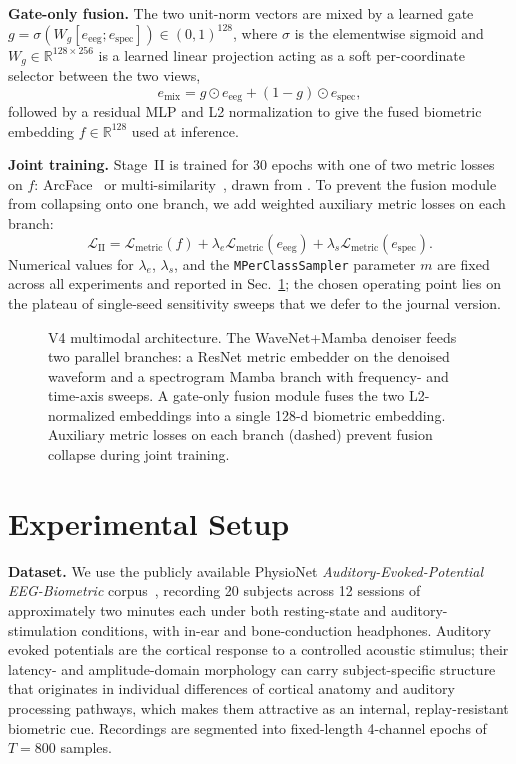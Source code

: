 \documentclass[conference,a4paper]{APSIPA2026}
\begin{document}
\textbf{Gate-only fusion.} The two unit-norm vectors are mixed by a
learned gate
$g=\sigma(W_g[e_{\mathrm{eeg}};e_{\mathrm{spec}}])\in(0,1)^{128}$,
where $\sigma$ is the elementwise sigmoid and
$W_g\in\mathbb{R}^{128\times 256}$ is a learned linear projection
acting as a soft per-coordinate selector between the two views,
\begin{equation}
e_{\mathrm{mix}}=g\odot e_{\mathrm{eeg}}
+(1-g)\odot e_{\mathrm{spec}},
\end{equation}
followed by a residual MLP and L2 normalization to give the fused
biometric embedding $f\in\mathbb{R}^{128}$ used at inference.

\textbf{Joint training.} Stage~II is trained for 30 epochs with one of
two metric losses on $f$: ArcFace~\cite{deng2019arcface} or
multi-similarity~\cite{wang2019multisim}, drawn from
\cite{musgrave2020pml}. To prevent the fusion module from collapsing onto
one branch, we add weighted auxiliary metric losses on each branch:
\begin{equation}
\mathcal{L}_{\mathrm{II}}=\mathcal{L}_{\mathrm{metric}}(f)
+\lambda_{e}\mathcal{L}_{\mathrm{metric}}(e_{\mathrm{eeg}})
+\lambda_{s}\mathcal{L}_{\mathrm{metric}}(e_{\mathrm{spec}}).
\end{equation}
Numerical values for $\lambda_{e}$, $\lambda_{s}$, and the
\texttt{MPerClassSampler} parameter $m$ are fixed across all
experiments and reported in Sec.~\ref{sec:setup}; the chosen
operating point lies on the plateau of single-seed sensitivity
sweeps that we defer to the journal version.

\begin{figure}[t]
\centering
\resizebox{\textwidth}{!}{}
\caption{V4 multimodal architecture. The WaveNet+Mamba denoiser feeds two
parallel branches: a ResNet metric embedder on the denoised waveform and
a spectrogram Mamba branch with frequency- and time-axis sweeps. A
gate-only fusion module fuses the two L2-normalized
embeddings into a single 128-d biometric embedding. Auxiliary metric losses
on each branch (dashed) prevent fusion collapse during joint training.}
\label{fig:v4-arch}
\end{figure}

\section{Experimental Setup}
\label{sec:setup}
\textbf{Dataset.} We use the publicly available PhysioNet
\emph{Auditory-Evoked-Potential EEG-Biometric} corpus~\cite{alzahab2024aep},
recording 20 subjects across 12 sessions of approximately two minutes
each under both resting-state and auditory-stimulation conditions, with
in-ear and bone-conduction headphones. Auditory evoked potentials are
the cortical response to a controlled acoustic stimulus; their
latency- and amplitude-domain morphology can carry subject-specific
structure that originates in individual differences
of cortical anatomy and auditory processing pathways, which makes them
attractive as an internal, replay-resistant biometric cue.
Recordings are segmented into fixed-length 4-channel epochs of
$T=800$ samples.
\end{document}
